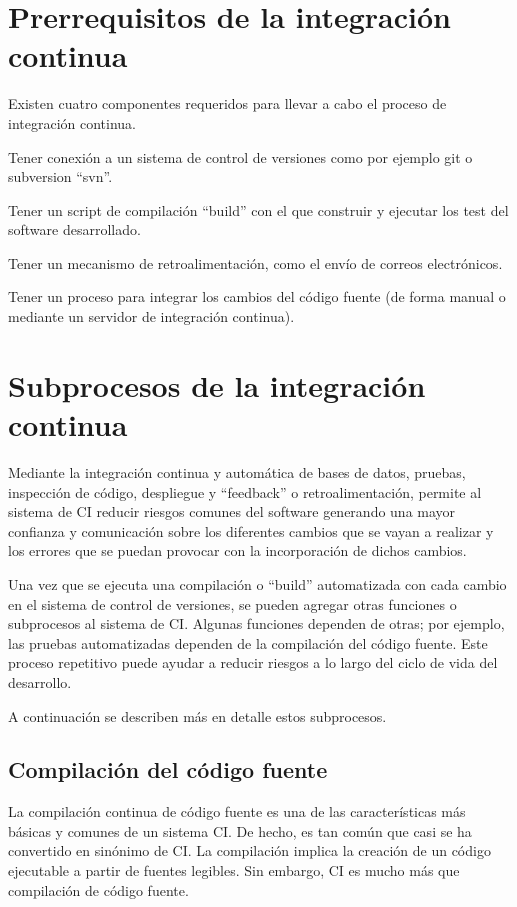 \section{Prerrequisitos de la integración continua}
Existen cuatro componentes requeridos para llevar a cabo el proceso de integración continua.
\begin{compactitem}
    \item Tener conexión a un sistema de control de versiones como por ejemplo git o subversion ``svn''.
    \item Tener un script de compilación ``build'' con el que construir y ejecutar los test del software desarrollado.
    \item Tener un mecanismo de retroalimentación, como el envío de correos electrónicos.
    \item Tener un proceso para integrar los cambios del código fuente (de forma manual o mediante un servidor de integración continua).
\end{compactitem}

\section{Subprocesos de la integración continua}
Mediante la integración continua y automática de bases de datos, pruebas, inspección de código, despliegue y ``feedback'' o retroalimentación, permite al sistema de CI reducir riesgos comunes del software generando una mayor confianza y comunicación sobre los diferentes cambios que se vayan a realizar y los errores que se puedan provocar con la incorporación de dichos cambios. 

Una vez que se ejecuta una compilación o ``build'' automatizada con cada cambio en el sistema de control de versiones, se pueden agregar otras funciones o subprocesos al sistema de CI. Algunas funciones dependen de otras; por ejemplo, las pruebas automatizadas  dependen de la compilación del código fuente. Este proceso repetitivo puede ayudar a reducir riesgos a lo largo del ciclo de vida del desarrollo.

A continuación se describen más en detalle estos subprocesos.

\subsection{Compilación del código fuente}
La compilación continua de código fuente es una de las características más básicas y comunes de un sistema CI. De hecho, es tan común que casi se ha convertido en sinónimo de CI. La compilación implica la creación de un código ejecutable a partir de fuentes legibles. Sin embargo, CI es mucho más que compilación de código fuente.


